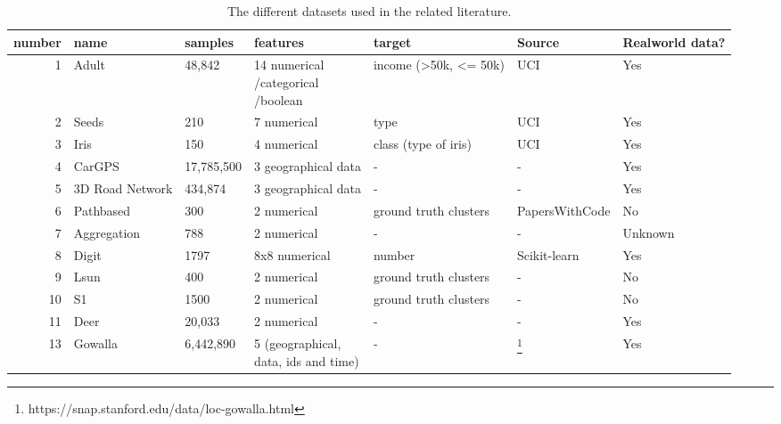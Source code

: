 \begin{landscape}
\begin{table}
    \begin{tabular}{rllllll}
      \toprule
      number & name            & samples    & features                      & target                & Source         & Realworld data? \\
      \midrule
      1      & Adult           & 48,842     & \makecell[l]{14 numerical                                                                \\ /categorical \\ /boolean}    & income (>50k, <= 50k) & UCI                                             & Yes             \\
      2      & Seeds           & 210        & 7 numerical                   & type                  & UCI            & Yes             \\
      3      & Iris            & 150        & 4 numerical                   & class (type of iris)  & UCI            & Yes             \\
      4      & CarGPS          & 17,785,500 & 3 geographical data           & -                     & -              & Yes             \\
      5      & 3D Road Network & 434,874    & 3 geographical data           & -                     & -              & Yes             \\
      6      & Pathbased       & 300        & 2 numerical                   & ground truth clusters & PapersWithCode & No              \\
      7      & Aggregation     & 788        & 2 numerical                   & -                     & -              & Unknown         \\
      8      & Digit           & 1797       & 8x8 numerical                 & number                & Scikit-learn   & Yes             \\
      9      & Lsun            & 400        & 2 numerical                   & ground truth clusters & -              & No              \\
      10     & S1              & 1500       & 2 numerical                   & ground truth clusters & -              & No              \\
      11     & Deer            & 20,033     & 2 numerical                   & -                     & -              & Yes             \\
      13     & Gowalla         & 6,442,890  & \makecell[l]{5 (geographical,                                                            \\ data, ids and time)} & -                     & \footnote{https://snap.stanford.edu/data/loc-gowalla.html} & Yes             \\
      \bottomrule
    \end{tabular}
    \caption{The different datasets used in the related literature.}
    \label{tab:datasets}
  \end{table}
\end{landscape}

